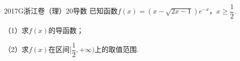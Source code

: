 
\begin{problem}{2017}{G}{浙江卷（理）}{20}{导数}
已知函数$f(x)=(x-\sqrt{2x-1})e^{-x}$，$x\geq\dfrac{1}{2}$.

（1）求$f(x)$的导函数；

（2）求$f(x)$在区间$[\dfrac{1}{2},+\infty)$上的取值范围.
\end{problem}